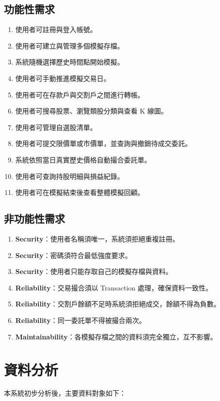 \documentclass[UTF8, a4paper, 12pt, fontset=none]{ctexart}
\begin{document}
    \subsection{功能性需求}
    \begin{enumerate}
        \item 使用者可註冊與登入帳號。
        \item 使用者可建立與管理多個模擬存檔。
        \item 系統隨機選擇歷史時間點開始模擬。
        \item 使用者可手動推進模擬交易日。
        \item 使用者可在存款戶與交割戶之間進行轉帳。
        \item 使用者可搜尋股票、瀏覽類股分類與查看 K 線圖。
        \item 使用者可管理自選股清單。
        \item 使用者可提交限價單或市價單，並查詢與撤銷待成交委託。
        \item 系統依照當日真實歷史價格自動撮合委託單。
        \item 使用者可查詢持股明細與損益紀錄。
        \item 使用者可在模擬結束後查看整體模擬回顧。
    \end{enumerate}

    \subsection{非功能性需求}
    \begin{enumerate}
        \item \textbf{Security}：使用者名稱須唯一，系統須拒絕重複註冊。
        \item \textbf{Security}：密碼須符合最低強度要求。
        \item \textbf{Security}：使用者只能存取自己的模擬存檔與資料。
        \item \textbf{Reliability}：交易撮合須以 Transaction 處理，確保資料一致性。
        \item \textbf{Reliability}：交割戶餘額不足時系統須拒絕成交，餘額不得為負數。
        \item \textbf{Reliability}：同一委託單不得被撮合兩次。
        \item \textbf{Maintainability}：各模擬存檔之間的資料須完全獨立，互不影響。
    \end{enumerate}

    \section{資料分析}
    本系統初步分析後，主要資料對象如下：
\end{document}
